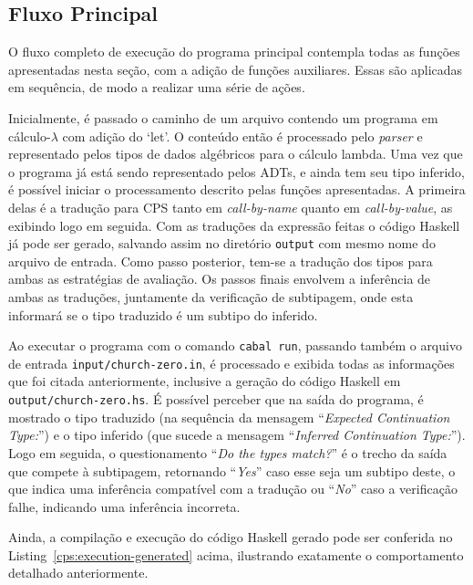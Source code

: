 \subsection{Fluxo Principal}\label{subsec:cps-main-program}
O fluxo completo de execução do programa principal contempla todas as funções apresentadas nesta seção, com a adição de funções auxiliares.
Essas são aplicadas em sequência, de modo a realizar uma série de ações.

Inicialmente, é passado o caminho de um arquivo contendo um programa em cálculo-$\lambda$ com adição do `let'.
O conteúdo então é processado pelo \textit{parser} e representado pelos tipos de dados algébricos para o cálculo lambda.
Uma vez que o programa já está sendo representado pelos ADTs, e ainda tem seu tipo inferido, é possível iniciar o processamento descrito pelas funções apresentadas.
A primeira delas é a tradução para CPS tanto em \textit{call-by-name} quanto em \textit{call-by-value}, as exibindo logo em seguida.
Com as traduções da expressão feitas o código Haskell já pode ser gerado, salvando assim no diretório \texttt{output} com mesmo nome do arquivo de entrada.
Como passo posterior, tem-se a tradução dos tipos para ambas as estratégias de avaliação.
Os passos finais envolvem a inferência de ambas as traduções, juntamente da verificação de subtipagem, onde esta informará se o tipo traduzido é um subtipo do inferido.

\lstset{extendedchars=false, escapeinside=''}

Ao executar o programa com o comando \texttt{cabal run}, passando também o arquivo de entrada \texttt{input/church-zero.in}, é processado e exibida todas as informações que foi citada anteriormente, inclusive a geração do código Haskell em \texttt{output/church-zero.hs}.
É possível perceber que na saída do programa, é mostrado o tipo traduzido (na sequência da mensagem ``\textit{Expected Continuation Type:}'') e o tipo inferido (que sucede a mensagem ``\textit{Inferred Continuation Type:}'').
Logo em seguida, o questionamento ``\textit{Do the types match?}'' é o trecho da saída que compete à subtipagem, retornando ``\textit{Yes}'' caso esse seja um subtipo deste, o que indica uma inferência compatível com a tradução ou ``\textit{No}'' caso a verificação falhe, indicando uma inferência incorreta.

\lstset{extendedchars=false, escapeinside=''}

Ainda, a compilação e execução do código Haskell gerado pode ser conferida no Listing~\ref{cps:execution-generated} acima, ilustrando exatamente o comportamento detalhado anteriormente.
